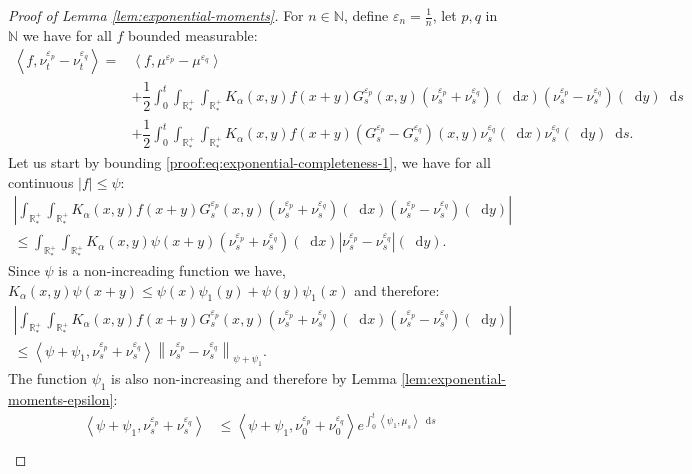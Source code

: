 \documentclass[11pt,a4paper]{article}
\newcommand{\NN}{\mathbb{N}}
\newcommand{\RRP}{\mathbb{R}^+_*}
\newcommand{\brac}[1]{\left\langle#1\right\rangle}
\newcommand{\dd}{\mathop{}\!\mathrm{d}}
\begin{document}
\begin{proof}[Proof of Lemma \ref{lem:exponential-moments}]
    For $n\in \NN$, define $\varepsilon_n = \frac1n$, let $p,q$ in $\NN$ we have for all $f$ bounded measurable:
    \begin{subequations}
    \begin{align}
        \brac{f,\nu_t^{\varepsilon_p}-\nu_t^{\varepsilon_q}} =& \brac{f,\mu^{\varepsilon_p} - \mu^{\varepsilon_q}} 
        \nonumber \\
        &+ \dfrac12\int_0^t \int_{\RRP}\int_{\RRP}K_\alpha(x,y)f(x+y) G^{\varepsilon_p}_s(x,y)(\nu_s^{\varepsilon_p} + \nu_s^{\varepsilon_q})(\dd x)(\nu_s^{\varepsilon_p} -\nu_s^{\varepsilon_q} )(\dd y)\dd s \label{proof:eq:exponential-completeness-1}\\
        &+ \dfrac12\int_0^t\int_{\RRP}\int_{\RRP}K_\alpha(x,y)f(x+y) (G^{\varepsilon_p}_s - G^{\varepsilon_q}_s)(x,y)\nu_s^{\varepsilon_q}(\dd x)\nu_s^{\varepsilon_q}(\dd y) \dd s.\label{proof:eq:exponential-completeness-2}
    \end{align}
    \label{proof:eq:exponential-completeness}
    \end{subequations}
    Let us start by bounding \eqref{proof:eq:exponential-completeness-1}, we have for all continuous $|f| \leq \psi$:
    \begin{multline*}
        \left|\int_{\RRP}\int_{\RRP}K_\alpha(x,y)f(x+y) G^{\varepsilon_p}_s(x,y)(\nu_s^{\varepsilon_p} + \nu_s^{\varepsilon_q})(\dd x)(\nu_s^{\varepsilon_p} -\nu_s^{\varepsilon_q} )(\dd y)\right| \\
        \leq \int_{\RRP}\int_{\RRP}K_\alpha(x,y)\psi(x+y) (\nu_s^{\varepsilon_p} + \nu_s^{\varepsilon_q})(\dd x)\left|\nu_s^{\varepsilon_p} -\nu_s^{\varepsilon_q} \right|(\dd y).
    \end{multline*}
    Since $\psi$ is a non-increading function we have, $K_\alpha(x,y)\psi(x+y) \leq \psi(x)\psi_1(y) + \psi(y)\psi_1(x)$ and therefore:
    \begin{multline*}
        \left|\int_{\RRP}\int_{\RRP}K_\alpha(x,y)f(x+y) G^{\varepsilon_p}_s(x,y)(\nu_s^{\varepsilon_p} + \nu_s^{\varepsilon_q})(\dd x)\left(\nu_s^{\varepsilon_p} -\nu_s^{\varepsilon_q}\right)(\dd y)\right| \\
        \leq \brac{\psi + \psi_1, \nu_s^{\varepsilon_p} + \nu_s^{\varepsilon_q}} \left\|\nu_s^{\varepsilon_p} - \nu_s^{\varepsilon_q} \right\|_{\psi + \psi_1}.
    \end{multline*}
    The function $\psi_1$ is also non-increasing and therefore by Lemma \ref{lem:exponential-moments-epsilon}:
    \begin{align*}
        \brac{\psi + \psi_1, \nu_s^{\varepsilon_p} + \nu_s^{\varepsilon_q}} &\leq \brac{\psi + \psi_1, \nu_0^{\varepsilon_p} + \nu_0^{\varepsilon_q}} e^{\int_0^t \brac{\psi_1,\mu_s}\dd s}\\

\end{align*}
\end{proof}
\end{document}
